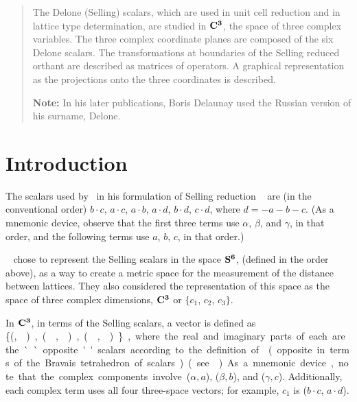 \documentclass[]{iucr}              %
\numberwithin{equation}{section}
\newcommand{\SVI}[0]{$\bf{S^{6}}$}
\newcommand{\CIII}[0]{$\bf{C^{3}}$}
\begin{document}
	\newcommand{\OPES}[0]{$E^3toS^6$}
	\newcommand{\OPESS}[0]{$$E^3toS^6$$}
	\newcommand{\MSVI}[0]{$M_{S^{6}}$}
	\newcommand{\MEIII}[0]{$M_{E^{3}}$}
	\newcommand{\Plus}[0]{\mathcal{P}}	
	\newcommand{\Minus}[0]{\mathcal{M}}
	
	\newcommand{\ci}[0]{$c_1$}
	\newcommand{\cii}[0]{$c_2$}
	\newcommand{\ciii}[0]{$c_3$}
	
	
	\begin{abstract}
		The Delone (Selling) scalars, which are used in 
		unit cell reduction and in lattice type determination,
		are studied in \CIII, the space of three complex variables.
		The three complex coordinate planes are composed of the six
		Delone scalars. The transformations at boundaries of the
		Selling reduced orthant are described as matrices of operators.
		A graphical representation as the projections onto the
		three coordinates is described.
		
		{\bf Note:}  In his later publications, Boris Delaunay used the Russian version of his surname, Delone.\\
		
		
	\end{abstract}
	
	
	\section{Introduction}
	
	The scalars used by~ in his formulation of Selling reduction ~\cite{Selling1874}
	are (in the conventional order) $b \cdot c$, $a \cdot c$, $a \cdot b$, $a \cdot d$, 
	$b \cdot d$, $c \cdot d$, where $d = -a-b-c$. 
	(As a mnemonic device, 
	observe that the first three terms use
	$\alpha$, $\beta$, and $\gamma$, 
	in that order, 
	and the following terms use $a$, $b$, $c$, in that order.)
	
	~ chose to 
	represent the Selling scalars in the space \SVI{},
	\Svec{} (defined in the order above), 
	as a way to create a metric space
	for the measurement of the distance between lattices. 
	They also considered the representation 
	of this space as the
	space of three complex dimensions, \CIII{} or 
	{$\{c_1$}, {$c_2$}, {$c_3\}$}. 	
	
	In \CIII{}, in terms of the Selling scalars, 
	a vector is defined as \{(\si,\siv ), (\sii,\sv),(\siii,\svi)\}, 
	where the real and imaginary parts
	of each are the ``opposite'' scalars 
	according to the definition of~
	(opposite in terms of the Bravais tetrahedron of scalars) (see~).
	As a mnemonic device, 
	note that the complex components involve ($\alpha,a$), ($\beta, b$), and ($\gamma,c$).
	Additionally, each complex term uses all 
	four three-space vectors; for example, $c_1$ is ($b \cdot c$, $a \cdot d$).
	
\end{document}
